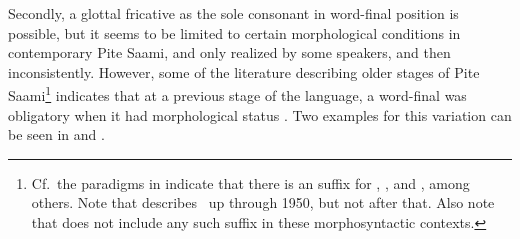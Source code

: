 Secondly, a glottal fricative \ipa{[h]} as the sole consonant in word-final position is possible, but it seems to be limited to certain morphological conditions in contemporary Pite Saami, and only realized by some speakers, and then inconsistently. 
However, some of the literature describing older stages of Pite Saami\footnote{Cf.~the paradigms in \citet[150-159]{Lehtiranta1992} indicate that there is an  suffix for , ,  and , among others. Note that \citet{Lehtiranta1992} describes \PS\ up through 1950, but not after that. Also note that \citet[104,120]{Lagercrantz1926} does not include any such suffix in these morphosyntactic contexts.} indicates that at a previous stage of the language, a word-final  was obligatory when it had morphological status%
. Two examples for this variation can be seen in  and .
\ea\label{work2SGPRS}
\z
\ea\label{fishDIMGENSG}
\z



